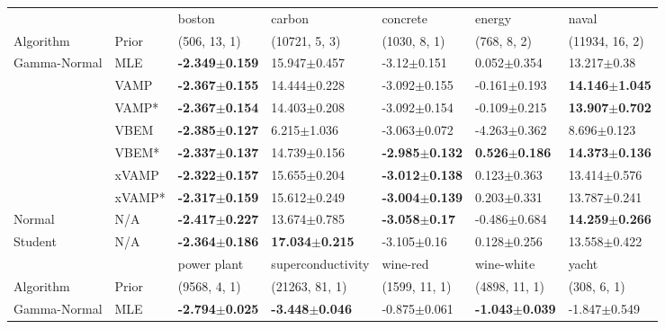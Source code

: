 \begin{tabular}{lllllll}
\toprule
        &     &                     boston &                     carbon &                   concrete &                    energy &                      naval \\
Algorithm & Prior& (506, 13, 1)& (10721, 5, 3)& (1030, 8, 1)& (768, 8, 2)& (11934, 16, 2)\\
\midrule
Gamma-Normal & MLE &  \textbf{-2.349$\pm$0.159} &           15.947$\pm$0.457 &            -3.12$\pm$0.151 &           0.052$\pm$0.354 &            13.217$\pm$0.38 \\
        & VAMP &  \textbf{-2.367$\pm$0.155} &           14.444$\pm$0.228 &           -3.092$\pm$0.155 &          -0.161$\pm$0.193 &  \textbf{14.146$\pm$1.045} \\
        & VAMP* &  \textbf{-2.367$\pm$0.154} &           14.403$\pm$0.208 &           -3.092$\pm$0.154 &          -0.109$\pm$0.215 &  \textbf{13.907$\pm$0.702} \\
        & VBEM &  \textbf{-2.385$\pm$0.127} &            6.215$\pm$1.036 &           -3.063$\pm$0.072 &          -4.263$\pm$0.362 &            8.696$\pm$0.123 \\
        & VBEM* &  \textbf{-2.337$\pm$0.137} &           14.739$\pm$0.156 &  \textbf{-2.985$\pm$0.132} &  \textbf{0.526$\pm$0.186} &  \textbf{14.373$\pm$0.136} \\
        & xVAMP &  \textbf{-2.322$\pm$0.157} &           15.655$\pm$0.204 &  \textbf{-3.012$\pm$0.138} &           0.123$\pm$0.363 &           13.414$\pm$0.576 \\
        & xVAMP* &  \textbf{-2.317$\pm$0.159} &           15.612$\pm$0.249 &  \textbf{-3.004$\pm$0.139} &           0.203$\pm$0.331 &           13.787$\pm$0.241 \\
Normal & N/A &  \textbf{-2.417$\pm$0.227} &           13.674$\pm$0.785 &   \textbf{-3.058$\pm$0.17} &          -0.486$\pm$0.684 &  \textbf{14.259$\pm$0.266} \\
Student & N/A &  \textbf{-2.364$\pm$0.186} &  \textbf{17.034$\pm$0.215} &            -3.105$\pm$0.16 &           0.128$\pm$0.256 &           13.558$\pm$0.422 \\
\midrule
        &     &                power plant &          superconductivity &                  wine-red &                 wine-white &                      yacht \\
Algorithm & Prior& (9568, 4, 1)& (21263, 81, 1)& (1599, 11, 1)& (4898, 11, 1)& (308, 6, 1)\\
\midrule
Gamma-Normal & MLE &  \textbf{-2.794$\pm$0.025} &  \textbf{-3.448$\pm$0.046} &          -0.875$\pm$0.061 &  \textbf{-1.043$\pm$0.039} &           -1.847$\pm$0.549 \\

\end{tabular}
